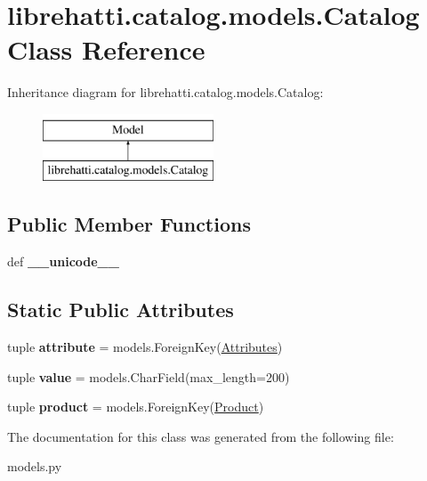 \hypertarget{classlibrehatti_1_1catalog_1_1models_1_1Catalog}{\section{librehatti.\-catalog.\-models.\-Catalog Class Reference}
\label{classlibrehatti_1_1catalog_1_1models_1_1Catalog}
}
Inheritance diagram for librehatti.\-catalog.\-models.\-Catalog\-:\begin{figure}[H]
\begin{center}
\leavevmode
\includegraphics[height=2.000000cm]{classlibrehatti_1_1catalog_1_1models_1_1Catalog}
\end{center}
\end{figure}
\subsection*{Public Member Functions}
\begin{DoxyCompactItemize}
\item 
\hypertarget{classlibrehatti_1_1catalog_1_1models_1_1Catalog_a32caca4cb8a9eeb837b88141eec57105}{def {\bfseries \-\_\-\-\_\-unicode\-\_\-\-\_\-}}\label{classlibrehatti_1_1catalog_1_1models_1_1Catalog_a32caca4cb8a9eeb837b88141eec57105}

\end{DoxyCompactItemize}
\subsection*{Static Public Attributes}
\begin{DoxyCompactItemize}
\item 
\hypertarget{classlibrehatti_1_1catalog_1_1models_1_1Catalog_a5e7e576cafc76d1ae0fdd47bc4655c37}{tuple {\bfseries attribute} = models.\-Foreign\-Key(\hyperlink{classlibrehatti_1_1catalog_1_1models_1_1Attributes}{Attributes})}\label{classlibrehatti_1_1catalog_1_1models_1_1Catalog_a5e7e576cafc76d1ae0fdd47bc4655c37}

\item 
\hypertarget{classlibrehatti_1_1catalog_1_1models_1_1Catalog_a1db0c58938a68db436b6a99aa200f6c4}{tuple {\bfseries value} = models.\-Char\-Field(max\-\_\-length=200)}\label{classlibrehatti_1_1catalog_1_1models_1_1Catalog_a1db0c58938a68db436b6a99aa200f6c4}

\item 
\hypertarget{classlibrehatti_1_1catalog_1_1models_1_1Catalog_a092102657aae060b989cf7eac0f6c7e9}{tuple {\bfseries product} = models.\-Foreign\-Key(\hyperlink{classlibrehatti_1_1catalog_1_1models_1_1Product}{Product})}\label{classlibrehatti_1_1catalog_1_1models_1_1Catalog_a092102657aae060b989cf7eac0f6c7e9}

\end{DoxyCompactItemize}


The documentation for this class was generated from the following file\-:\begin{DoxyCompactItemize}
\item 
models.\-py\end{DoxyCompactItemize}
